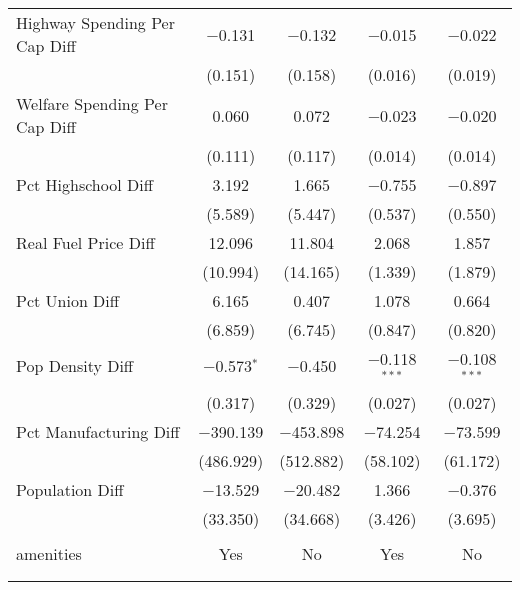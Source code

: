 \begin{table}[!htbp]
\begin{tabular}{@{\extracolsep{5pt}}lcccc}
  Highway Spending Per Cap Diff & $-$0.131 & $-$0.132 & $-$0.015 & $-$0.022 \\ 
  & (0.151) & (0.158) & (0.016) & (0.019) \\ 
  Welfare Spending Per Cap Diff & 0.060 & 0.072 & $-$0.023 & $-$0.020 \\ 
  & (0.111) & (0.117) & (0.014) & (0.014) \\ 
  Pct Highschool Diff & 3.192 & 1.665 & $-$0.755 & $-$0.897 \\ 
  & (5.589) & (5.447) & (0.537) & (0.550) \\ 
  Real Fuel Price Diff & 12.096 & 11.804 & 2.068 & 1.857 \\ 
  & (10.994) & (14.165) & (1.339) & (1.879) \\ 
  Pct Union Diff & 6.165 & 0.407 & 1.078 & 0.664 \\ 
  & (6.859) & (6.745) & (0.847) & (0.820) \\ 
  Pop Density Diff & $-$0.573$^{*}$ & $-$0.450 & $-$0.118$^{***}$ & $-$0.108$^{***}$ \\ 
  & (0.317) & (0.329) & (0.027) & (0.027) \\ 
  Pct Manufacturing Diff & $-$390.139 & $-$453.898 & $-$74.254 & $-$73.599 \\ 
  & (486.929) & (512.882) & (58.102) & (61.172) \\ 
  Population Diff & $-$13.529 & $-$20.482 & 1.366 & $-$0.376 \\ 
  & (33.350) & (34.668) & (3.426) & (3.695) \\ 
 \hline \\[-1.8ex] 
amenities & Yes & No & Yes & No \\ 
\hline \\[-1.8ex] 
\hline 
\hline \\[-1.8ex] 
\end{tabular} 
\end{table} 
